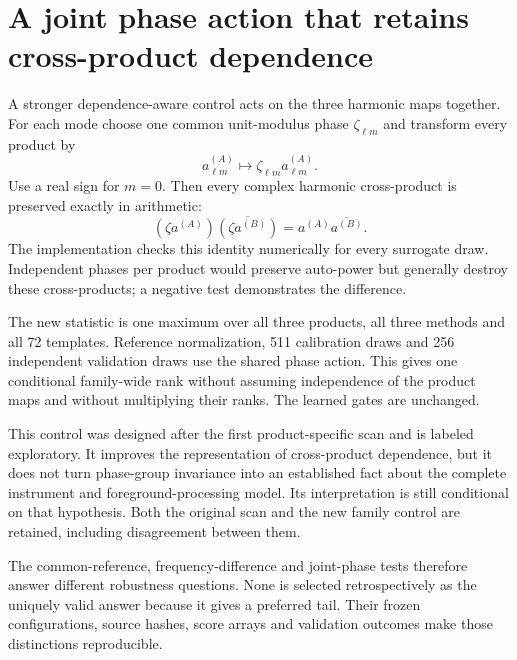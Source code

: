 \section{A joint phase action that retains cross-product dependence}

A stronger dependence-aware control acts on the three harmonic maps together. For each mode choose one common unit-modulus phase $\zeta_{\ell m}$ and transform every product by
\[
 a_{\ell m}^{(A)}\longmapsto\zeta_{\ell m}a_{\ell m}^{(A)}.
\]
Use a real sign for $m=0$. Then every complex harmonic cross-product is preserved exactly in arithmetic:
\[
 (\zeta a^{(A)})\overline{(\zeta a^{(B)})}
 =a^{(A)}\overline{a^{(B)}}.
\]
The implementation checks this identity numerically for every surrogate draw. Independent phases per product would preserve auto-power but generally destroy these cross-products; a negative test demonstrates the difference.

The new statistic is one maximum over all three products, all three methods and all 72 templates. Reference normalization, 511 calibration draws and 256 independent validation draws use the shared phase action. This gives one conditional family-wide rank without assuming independence of the product maps and without multiplying their ranks. The learned gates are unchanged.

This control was designed after the first product-specific scan and is labeled exploratory. It improves the representation of cross-product dependence, but it does not turn phase-group invariance into an established fact about the complete instrument and foreground-processing model. Its interpretation is still conditional on that hypothesis. Both the original scan and the new family control are retained, including disagreement between them.

\begin{center}\small\end{center}

The common-reference, frequency-difference and joint-phase tests therefore answer different robustness questions. None is selected retrospectively as the uniquely valid answer because it gives a preferred tail. Their frozen configurations, source hashes, score arrays and validation outcomes make those distinctions reproducible.
